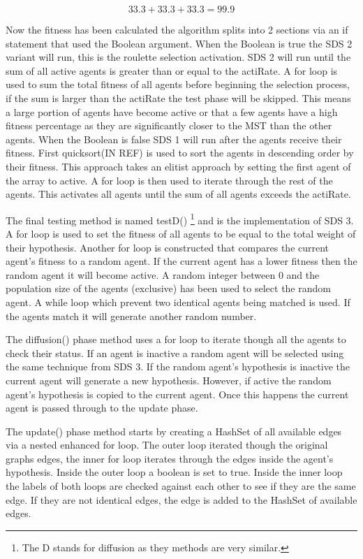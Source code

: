 \documentclass{AISB2008}
\begin{document}
\begin{equation}
33.3 + 33.3 + 33.3 = 99.9
\end{equation}

Now the fitness has been calculated the algorithm splits into 2 sections via an if statement that used the Boolean argument. When the Boolean is true the SDS 2 variant will run, this is the roulette selection activation. SDS 2 will run until the sum of all active agents is greater than or equal to the actiRate. A for loop is used to sum the total fitness of all agents before beginning the selection process, if the sum is larger than the actiRate the test phase will be skipped. This means a large portion of agents have become active or that a few agents have a high fitness percentage as they are significantly closer to the MST than the other agents.
When the Boolean is false SDS 1 will run after the agents receive their fitness. First quicksort(IN REF) is used to sort the agents in descending order by their fitness. This approach takes an elitist approach by setting the first agent of the array to active. A for loop is then used to iterate through the rest of the agents. This activates all agents until the sum of all agents exceeds the actiRate.

The final testing method is named testD() \footnote{The D stands for diffusion as they methods are very similar.} and is the implementation of SDS 3. A for loop is used to set the fitness of all agents to be equal to the total weight of their hypothesis. Another for loop is constructed that compares the current agent’s fitness to a random agent. If the current agent has a lower fitness then the random agent it will become active. A random integer between 0 and the population size of the agents (exclusive) has been used to select the random agent. A while loop which prevent two identical agents being matched is used. If the agents match it will generate another random number.

The diffusion() phase method uses a for loop to iterate though all the agents to check their status. If an agent is inactive a random agent will be selected using the same technique from SDS 3. If the random agent’s hypothesis is inactive the current agent will generate a new hypothesis. However, if active the random agent’s hypothesis is copied to the current agent. Once this happens the current agent is passed through to the update phase.

The update() phase method starts by creating a HashSet of all available edges via a nested enhanced for loop. The outer loop iterated though the original graphs edges, the inner for loop iterates through the edges inside the agent’s hypothesis. Inside the outer loop a boolean is set to true. Inside the inner loop the labels of both loops are checked against each other to see if they are the same edge. If they are not identical edges, the edge is added to the HashSet of available edges.
\end{document}
